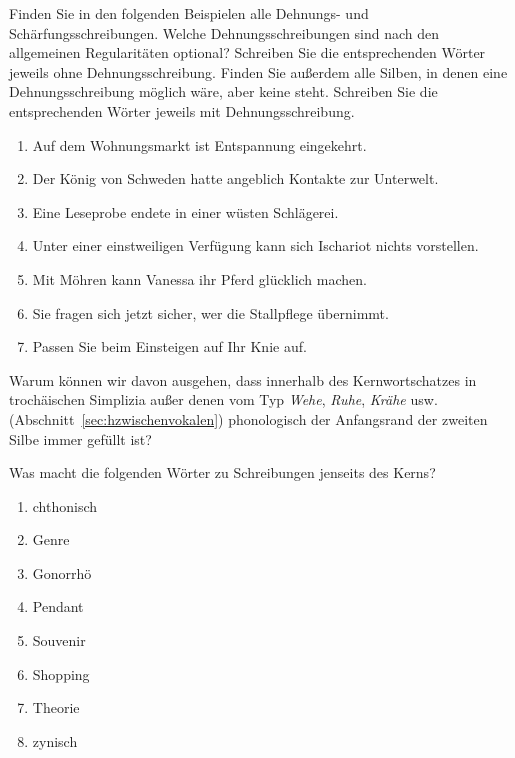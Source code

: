  \label{exc:phonologischeschreibprinzipien04} Finden Sie in den folgenden Beispielen alle Dehnungs- und Schärfungsschreibungen.
Welche Dehnungsschreibungen sind nach den allgemeinen Regularitäten optional?
Schreiben Sie die entsprechenden Wörter jeweils ohne Dehnungsschreibung.
Finden Sie außerdem alle Silben, in denen eine Dehnungsschreibung möglich wäre, aber keine steht.
Schreiben Sie die entsprechenden Wörter jeweils mit Dehnungsschreibung.

\begin{enumerate}
  \item Auf dem Wohnungsmarkt ist Entspannung eingekehrt.
  \item Der König von Schweden hatte angeblich Kontakte zur Unterwelt.
  \item Eine Leseprobe endete in einer wüsten Schlägerei.
  \item Unter einer einstweiligen Verfügung kann sich Ischariot nichts vorstellen.
  \item Mit Möhren kann Vanessa ihr Pferd glücklich machen.
  \item Sie fragen sich jetzt sicher, wer die Stallpflege übernimmt.
  \item Passen Sie beim Einsteigen auf Ihr Knie auf.
\end{enumerate}

 \label{exc:phonologischeschreibprinzipien05} Warum können wir davon ausgehen, dass innerhalb des Kernwortschatzes in trochäischen Simplizia außer denen vom Typ \textit{Wehe}, \textit{Ruhe}, \textit{Krähe} usw. (Abschnitt~\ref{sec:hzwischenvokalen}) phonologisch der Anfangsrand der zweiten Silbe immer gefüllt ist?

 \label{exc:phonologischeschreibprinzipien06} Was macht die folgenden Wörter zu Schreibungen jenseits des Kerns?

\begin{enumerate}
  \item chthonisch
  \item Genre
  \item Gonorrhö
  \item Pendant
  \item Souvenir
  \item Shopping
  \item Theorie
  \item zynisch
\end{enumerate}

